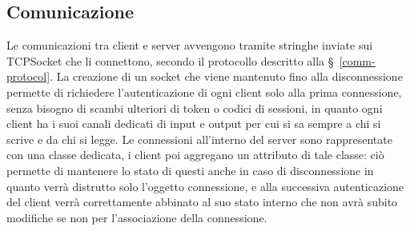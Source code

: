 \subsection{Comunicazione}

Le comunicazioni tra client e server avvengono tramite stringhe inviate sui TCPSocket che li connettono, secondo il protocollo descritto alla \S\ \ref{comm-protocol}. La creazione di un socket che viene mantenuto fino alla disconnessione permette di richiedere l'autenticazione di ogni client solo alla prima connessione, senza bisogno di scambi ulteriori di token o codici di sessioni, in quanto ogni client ha i suoi canali dedicati di input e output per cui si sa sempre a chi si scrive e da chi si legge. Le connessioni all'interno del server sono rappresentate con una classe dedicata, i client poi aggregano un attributo di tale classe: ciò permette di mantenere lo stato di questi anche in caso di disconnessione in quanto verrà distrutto solo l'oggetto connessione, e alla successiva autenticazione del client verrà correttamente abbinato al suo stato interno che non avrà subito modifiche se non per l'associazione della connessione.

